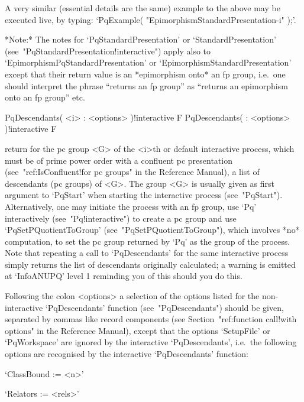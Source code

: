 A very similar (essential details are the same) example to the above may
be executed live, by typing:
`PqExample( "EpimorphismStandardPresentation-i" );'.

*Note:*
The  notes   for   `PqStandardPresentation'   or   `StandardPresentation'
(see~"PqStandardPresentation!interactive")      apply       also       to
`EpimorphismPqStandardPresentation' or  `EpimorphismStandardPresentation'
except that their return value is an  *epimorphism  onto*  an  fp  group,
i.e.~one should interpret the phrase ``returns an fp group'' as ``returns
an epimorphism onto an fp group'' etc.

\>PqDescendants( <i> : <options> )!{interactive} F
\>PqDescendants( : <options> )!{interactive} F

return for the pc group <G> of the <i>th or default interactive  {\ANUPQ}
process, which  must  be  of  prime  power  order  with  a  confluent  pc
presentation (see~"ref:IsConfluent!for pc groups" in the {\GAP} Reference
Manual), a list of descendants (pc groups)  of  <G>.  The  group  <G>  is
usually  given  as  first  argument  to  `PqStart'  when   starting   the
interactive {\ANUPQ}  process  (see~"PqStart").  Alternatively,  one  may
initiate  the  process  with  an  fp  group,   use   `Pq'   interactively
(see~"Pq!interactive")    to    create    a    pc    group    and     use
`PqSetPQuotientToGroup'  (see~"PqSetPQuotientToGroup"),  which   involves
*no* computation, to set the pc group returned by `Pq' as  the  group  of
the process. Note that repeating a call to `PqDescendants' for  the  same
interactive {\ANUPQ} process  simply  returns  the  list  of  descendants
originally calculated; a  warning  is  emitted  at  `InfoANUPQ'  level  1
reminding you of this should you do this.

Following the colon <options> a selection of the options listed  for  the
non-interactive `PqDescendants' function (see~"PqDescendants") should  be
given,   separated   by    commas    like    record    components    (see
Section~"ref:function call!with options" in the {\GAP} Reference Manual),
except that the options `SetupFile' or `PqWorkspace' are ignored  by  the
interactive `PqDescendants', i.e.~the following options are recognised by
the interactive `PqDescendants' function:

\beginlist%

\item{}`ClassBound := <n>'

\item{}`Relators := <rels>'

